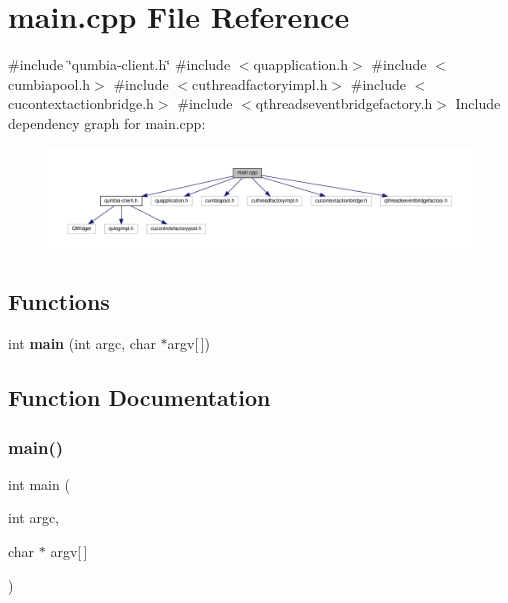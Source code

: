 \section{main.\+cpp File Reference}
\label{main_8cpp}
{\ttfamily \#include \char`\"{}qumbia-\/client.\+h\char`\"{}}\newline
{\ttfamily \#include $<$quapplication.\+h$>$}\newline
{\ttfamily \#include $<$cumbiapool.\+h$>$}\newline
{\ttfamily \#include $<$cuthreadfactoryimpl.\+h$>$}\newline
{\ttfamily \#include $<$cucontextactionbridge.\+h$>$}\newline
{\ttfamily \#include $<$qthreadseventbridgefactory.\+h$>$}\newline
Include dependency graph for main.\+cpp\+:
\nopagebreak
\begin{figure}[H]
\begin{center}
\leavevmode
\includegraphics[width=350pt]{main_8cpp__incl}
\end{center}
\end{figure}
\subsection*{Functions}
\begin{DoxyCompactItemize}
\item 
int \textbf{ main} (int argc, char $\ast$argv[$\,$])
\end{DoxyCompactItemize}


\subsection{Function Documentation}
\mbox{\label{main_8cpp_a0ddf1224851353fc92bfbff6f499fa97}} 
\subsubsection{main()}
{\footnotesize\ttfamily int main (\begin{DoxyParamCaption}\item[{int}]{argc,  }\item[{char $\ast$}]{argv[$\,$] }\end{DoxyParamCaption})}

